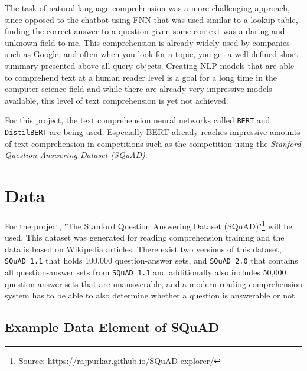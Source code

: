         The task of natural language comprehension was a more challenging approach, since opposed to the chatbot using FNN that was used similar to a lookup table, finding the correct answer to a question given some context was a daring and unknown field to me.
        This comprehension is already widely used by companies such as Google, and often when you look for a topic, you get a well-defined short summary presented above all query objects.
        Creating NLP-models that are able to comprehend text at a human reader level is a goal for a long time in the computer science field and while there are already very impressive models available, this level of text comprehension is yet not achieved.
        
        For this project, the text comprehension neural networks called \texttt{BERT} and \texttt{DistilBERT} are being used.
        Especially BERT already reaches impressive amounts of text comprehension in competitions such as the competition using the \emph{Stanford Question Answering Dataset (SQuAD)}.



    \section{Data}
    \label{sec:data}

        For the project, "The Stanford Question Answering Dataset (SQuAD)"\footnote{Source: https://rajpurkar.github.io/SQuAD-explorer/} will be used. This dataset was generated for reading comprehension training and the data is based on Wikipedia articles.
        There exist two versions of this dataset, \texttt{SQuAD 1.1} that holds 100,000 question-answer sets, and \texttt{SQuAD 2.0} that contains all question-answer sets from \texttt{SQuAD 1.1} and additionally also includes 50,000 question-answer sets that are unanswerable, and a modern reading comprehension system has to be able to also determine whether a question is answerable or not.


        \subsection{Example Data Element of SQuAD}
        \label{subsec:data-example}

